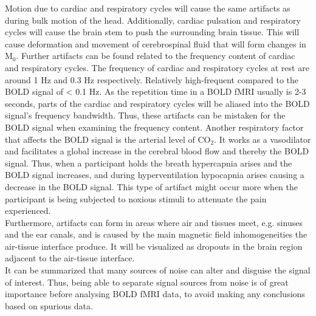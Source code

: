 Motion due to cardiac and respiratory cycles will cause the same artifacts as during bulk motion of the head. Additionally, cardiac pulsation and respiratory cycles will cause the brain stem to push the surrounding brain tissue. This will cause deformation and movement of cerebrospinal fluid that will form changes in M$_0$. Further artifacts can be found related to the frequency content of cardiac and respiratory cycles. The frequency of cardiac and respiratory cycles at rest are around 1 Hz and 0.3 Hz respectively. Relatively high-frequent compared to the BOLD signal of < 0.1 Hz. As the repetition time in a BOLD fMRI usually is 2-3 seconds, parts of the cardiac and respiratory cycles will be aliased into the BOLD signal’s frequency bandwidth. Thus, these artifacts can be mistaken for the BOLD signal when examining the frequency content. Another respiratory factor that affects the BOLD signal is the arterial level of CO$_2$. It works as a vasodilator and facilitates a global increase in the cerebral blood flow and thereby the BOLD signal. Thus, when a participant holds the breath hypercapnia arises and the BOLD signal increases, and during hyperventilation hypocapnia arises causing a decrease in the BOLD signal.  \cite{Murphy2013} This type of artifact might occur more when the participant is being subjected to noxious stimuli to attenuate the pain experienced. \\
Furthermore, artifacts can form in areas where air and tissues meet, e.g. sinuses and the ear canals, and is caused by the main magnetic field inhomogeneities the air-tissue interface produce. It will be visualized as dropouts in the brain region adjacent to the air-tissue interface. \cite{Poldrack2011} \\
It can be summarized that many sources of noise can alter and disguise the signal of interest. Thus, being able to separate signal sources from noise is of great importance before analysing BOLD fMRI data, to avoid making any conclusions based on spurious data.



